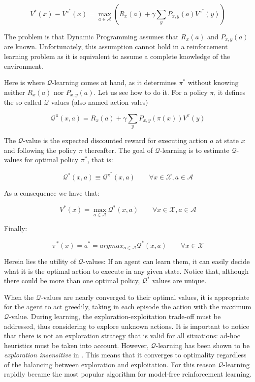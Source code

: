 $$
V^{*}(x) \equiv V^{\pi^{*}}(x) = \max_{a\in \mathcal{A}} (R_{x}(a) + \gamma \sum_{y} P_{x,y}(a)V^{\pi^{*}}(y))
$$

The problem is that Dynamic Programming assumes that $R_{x}(a)$ and $P_{x,y}(a)$ are known.
%
Unfortunately, this assumption cannot hold in a reinforcement learning problem as it is equivalent to assume a complete knowledge of the environment.

Here is where $\mathcal{Q}$-learning comes at hand, as it determines $\pi^{*}$ without knowing neither $R_{x}(a)$ nor $P_{x,y}(a)$.
Let us see how to do it.
%
For a policy $\pi$, it defines the so called $\mathcal{Q}$-values (also named action-vales)

\begin{equation}
\label{eqn:reinforcement-learning-q-value}
\mathcal{Q}^{\pi}(x,a) = R_{x}(a) + \gamma \sum_{y} P_{x,y}(\pi(x))V^{\pi}(y)
\end{equation}

The $\mathcal{Q}$-value is the expected discounted reward for executing action $a$ at state $x$ and following the policy $\pi$ thereafter.
The goal of $\mathcal{Q}$-learning is to estimate $\mathcal{Q}$-values for optimal policy $\pi^{*}$, that is:

\begin{equation}
\mathcal{Q}^{*}(x,a) \equiv \mathcal{Q}^{\pi^{*}}(x,a) \qquad \forall x\in\mathcal{X},a\in\mathcal{A}
\end{equation}

As a consequence we have that:

\begin{equation}
V^{*}(x) = \max_{a\in\mathcal{A}} \mathcal{Q}^{*}(x,a) \qquad \forall x\in\mathcal{X},a\in\mathcal{A}
\end{equation}

Finally:

\begin{equation}
\pi^{*}(x) = a^{*} = argmax_{a\in\mathcal{A}} \mathcal{Q}^{*}(x,a) \qquad \forall x\in\mathcal{X}
\end{equation}

Herein lies the utility of $\mathcal{Q}$-values: If an agent can learn them, it can easily decide what it is the optimal action to execute in any given state.
Notice that, although there could be more than one optimal policy, $\mathcal{Q}^{*}$ values are unique.

When the $\mathcal{Q}$-values are nearly converged to their optimal values, it is appropriate for the agent to act greedily, taking in each episode the action with the maximum $\mathcal{Q}$-value.
%
During learning, the exploration-exploitation trade-off must be addressed, thus considering to explore unknown actions. 
%
It is important to notice that there is not an exploration strategy that is valid for all situations: ad-hoc heuristics must be taken into account.
%
However, $\mathcal{Q}$-learning has been shown to be \textit{exploration insensitive} in \cite{watkins1992q}. This means that it converges to optimality regardless of the balancing between exploration and exploitation. For this reason $\mathcal{Q}$-learning rapidly became the most popular algorithm for model-free reinforcement learning. 

